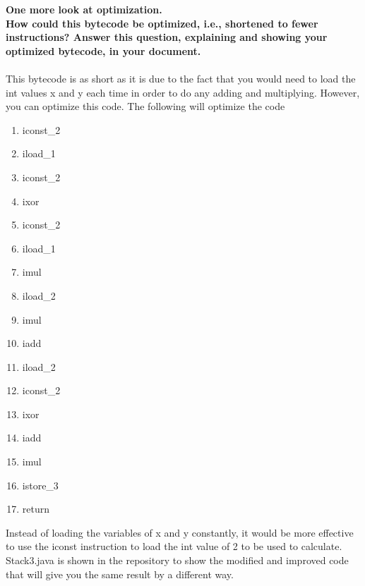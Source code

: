 \documentclass{article}
\begin{document}
\textbf{One more look at optimization.}
\\
\textbf{How could this bytecode be optimized, i.e., shortened to fewer instructions? Answer this question, explaining and showing your optimized bytecode, in your document.}
\\
\\
This bytecode is as short as it is due to the fact that you would need to load the int values x and y each time in order to do any adding and multiplying. However, you can optimize this code. The following will optimize the code
\begin{enumerate}
\item iconst\_2
\item iload\_1
\item iconst\_2
\item ixor
\item iconst\_2
\item iload\_1
\item imul
\item iload\_2
\item imul
\item iadd
\item iload\_2
\item iconst\_2
\item ixor
\item iadd
\item imul
\item istore\_3
\item return
\end{enumerate}
Instead of loading the variables of x and y constantly, it would be more effective to use the iconst instruction to load the int value of 2 to be used to calculate. Stack3.java is shown in the repository to show the modified and improved code that will give you the same result by a different way. 
\end{document}
